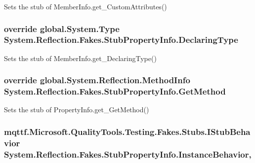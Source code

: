 Sets the stub of Member\-Info.\-get\-\_\-\-Custom\-Attributes()

\hypertarget{class_system_1_1_reflection_1_1_fakes_1_1_stub_property_info_a5abb823e05ef73b86a487dbc0a72fa02}{
\subsubsection[{Declaring\-Type}]{\setlength{\rightskip}{0pt plus 5cm}override global.\-System.\-Type System.\-Reflection.\-Fakes.\-Stub\-Property\-Info.\-Declaring\-Type\hspace{0.3cm}{\ttfamily [get]}}}\label{class_system_1_1_reflection_1_1_fakes_1_1_stub_property_info_a5abb823e05ef73b86a487dbc0a72fa02}


Sets the stub of Member\-Info.\-get\-\_\-\-Declaring\-Type()

\hypertarget{class_system_1_1_reflection_1_1_fakes_1_1_stub_property_info_a00b247caa9d8ba1c88a019d6ba951330}{
\subsubsection[{Get\-Method}]{\setlength{\rightskip}{0pt plus 5cm}override global.\-System.\-Reflection.\-Method\-Info System.\-Reflection.\-Fakes.\-Stub\-Property\-Info.\-Get\-Method\hspace{0.3cm}{\ttfamily [get]}}}\label{class_system_1_1_reflection_1_1_fakes_1_1_stub_property_info_a00b247caa9d8ba1c88a019d6ba951330}


Sets the stub of Property\-Info.\-get\-\_\-\-Get\-Method()

\hypertarget{class_system_1_1_reflection_1_1_fakes_1_1_stub_property_info_a97b33076b353c8e9baecc3d022469d11}{
\subsubsection[{Instance\-Behavior}]{\setlength{\rightskip}{0pt plus 5cm}mqttf.\-Microsoft.\-Quality\-Tools.\-Testing.\-Fakes.\-Stubs.\-I\-Stub\-Behavior System.\-Reflection.\-Fakes.\-Stub\-Property\-Info.\-Instance\-Behavior\hspace{0.3cm}{\ttfamily [get]}, {\ttfamily [set]}}}\label{class_system_1_1_reflection_1_1_fakes_1_1_stub_property_info_a97b33076b353c8e9baecc3d022469d11}


